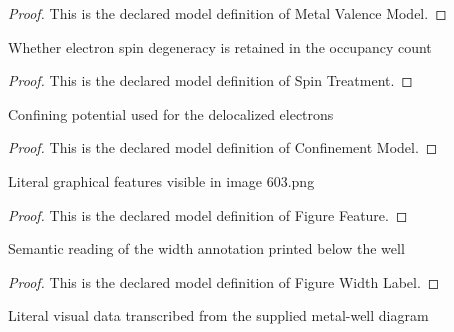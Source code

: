\begin{proof}
  This is the declared model definition of Metal Valence Model.
\end{proof}
\begin{definition}
  \label{def:physics:phyx-mini-0603:phyxminiproblems-problemphyxmini0603-spintreatment}
  Whether electron spin degeneracy is retained in the occupancy count
\end{definition}
\begin{proof}
  This is the declared model definition of Spin Treatment.
\end{proof}
\begin{definition}
  \label{def:physics:phyx-mini-0603:phyxminiproblems-problemphyxmini0603-confinementmodel}
  Confining potential used for the delocalized electrons
\end{definition}
\begin{proof}
  This is the declared model definition of Confinement Model.
\end{proof}
\begin{definition}
  \label{def:physics:phyx-mini-0603:phyxminiproblems-problemphyxmini0603-figurefeature}
  Literal graphical features visible in image 603.png
\end{definition}
\begin{proof}
  This is the declared model definition of Figure Feature.
\end{proof}
\begin{definition}
  \label{def:physics:phyx-mini-0603:phyxminiproblems-problemphyxmini0603-figurewidthlabel}
  Semantic reading of the width annotation printed below the well
\end{definition}
\begin{proof}
  This is the declared model definition of Figure Width Label.
\end{proof}
\begin{definition}
  \label{def:physics:phyx-mini-0603:phyxminiproblems-problemphyxmini0603-metalwellfigure}
  Literal visual data transcribed from the supplied metal-well diagram
\end{definition}
